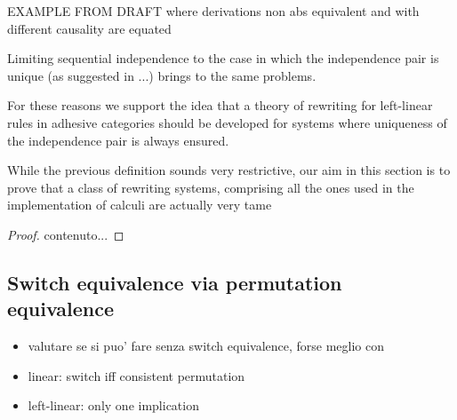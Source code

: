 \documentclass[a4paper,UKenglish,cleveref,pdftex, thm-restate,numberwithinsect]{lipics}
\begin{document}
EXAMPLE FROM DRAFT where derivations non abs equivalent and with different causality are equated

Limiting sequential independence to the case in which the independence pair is unique (as suggested in ...) brings to the same problems.

For these reasons we support the idea that a theory of rewriting for left-linear rules in adhesive categories should be developed for systems where uniqueness of the independence pair is always ensured.







\begin{definition}
\end{definition}
While the previous definition sounds very restrictive, our aim in this section is to prove that a class of rewriting systems, comprising all the ones used in the implementation of calculi are actually very tame



\begin{definition}
\end{definition}
\begin{lemma}
\end{lemma}
\begin{proof}
	contenuto...
\end{proof}


\subsection{Switch equivalence via permutation equivalence}

\begin{itemize}
\item valutare se si puo' fare senza switch equivalence, forse meglio con

 
\item linear: switch iff consistent permutation
  
\item left-linear: only one implication
\end{itemize}
\end{document}
